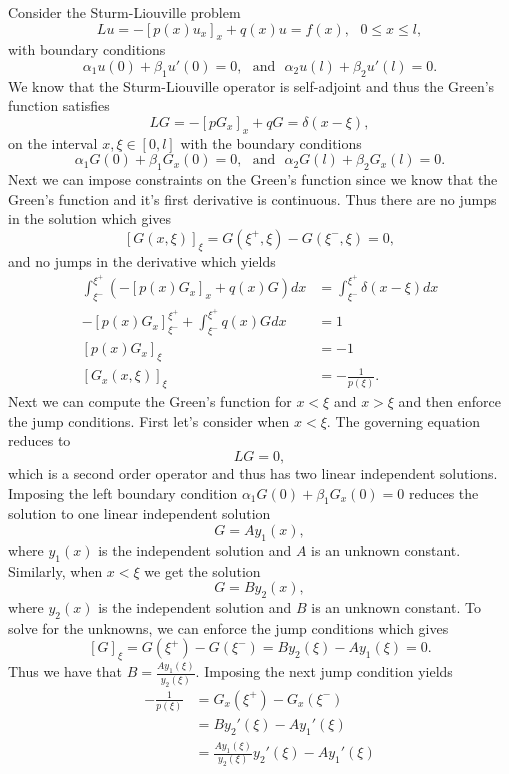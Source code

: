 \documentclass[12pt]{report}
\begin{document}
\begin{solution}
    \noindent
    Consider the Sturm-Liouville problem
    \[ 
        Lu = -[p(x)u_x]_x + q(x)u = f(x), ~~~ 0 \leq x \leq l,
    \]
    with boundary conditions 
    \[ 
        \alpha_1 u(0) + \beta_1u'(0) = 0, ~~~ \text{and} ~~~ \alpha_2 u(l) + \beta_2 u'(l) = 0.
    \]
    We know that the Sturm-Liouville operator is self-adjoint and thus the Green's function satisfies
    \[
        LG = -[pG_x]_x + qG = \delta(x - \xi),
    \]
    on the interval $x,\xi \in [0,l]$ with the boundary conditions
    \[ 
        \alpha_1 G(0) + \beta_1G_x(0) = 0, ~~~ \text{and} ~~~ \alpha_2 G(l) + \beta_2 G_x(l) = 0.
    \]
    Next we can impose constraints on the Green's function since we know that the Green's function and it's first derivative is continuous. Thus there are no jumps in the solution which gives
    \[ 
        [G(x,\xi)]_\xi = G(\xi^+,\xi) - G(\xi^-,\xi) = 0,
    \]
    and no jumps in the derivative which yields
    \begin{align*}
        \int_{\xi^-}^{\xi^+}(-[p(x)G_x]_x + q(x)G)dx &= \int_{\xi^-}^{\xi^+}\delta(x -\xi)dx\\
        -[p(x)G_x]_{\xi^-}^{\xi^+} + \int_{\xi^-}^{\xi^+}q(x)Gdx &= 1\\
        [p(x)G_x]_\xi&=-1\\
        [G_x(x,\xi)]_\xi &= - \frac{1}{p(\xi)}.
    \end{align*}
    Next we can compute the Green's function for $x < \xi$ and $x > \xi$ and then enforce the jump conditions. First let's consider when $x < \xi$. The governing equation reduces to 
    \[ 
        LG = 0,
    \] 
    which is a second order operator and thus has two linear independent solutions. Imposing the left boundary condition $\alpha_1 G(0) + \beta_1G_x(0) = 0$ reduces the solution to one linear independent solution
    \[ 
        G = Ay_1(x),
    \]
    where $y_1(x)$ is the independent solution and $A$ is an unknown constant. Similarly, when $x < \xi$ we get the solution
    \[ 
        G = By_2(x),
    \] 
    where $y_2(x)$ is the independent solution and $B$ is an unknown constant. To solve for the unknowns, we can enforce the jump conditions which gives
    \[
        [G]_\xi = G(\xi^+) - G(\xi^-) = By_2(\xi) - Ay_1(\xi) = 0.
    \]
    Thus we have that $B = \frac{Ay_1(\xi)}{y_2(\xi)}$. Imposing the next jump condition yields
    \begin{align*}
        - \frac{1}{p(\xi)} &= G_x(\xi^+) - G_x(\xi^-)\\
        &= By_2'(\xi) - Ay_1'(\xi)\\
        &= \frac{Ay_1(\xi)}{y_2(\xi)} y_2'(\xi) - Ay_1'(\xi)\\

\end{align*}
\end{solution}
\end{document}
